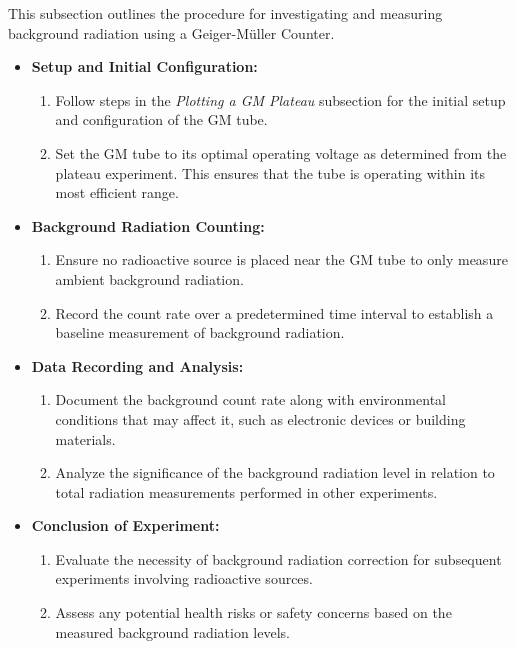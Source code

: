 \documentclass[11pt]{article}
\begin{document}
	This subsection outlines the procedure for investigating and measuring background radiation using a Geiger-Müller Counter.
	\begin{itemize}
		\item \textbf{Setup and Initial Configuration:}
		\begin{enumerate}
			\item Follow steps in the \textit{Plotting a GM Plateau} subsection for the initial setup and configuration of the GM tube.
			\item Set the GM tube to its optimal operating voltage as determined from the plateau experiment. This ensures that the tube is operating within its most efficient range.
		\end{enumerate}
		
		\item \textbf{Background Radiation Counting:}
		\begin{enumerate}
			\item Ensure no radioactive source is placed near the GM tube to only measure ambient background radiation.
			\item Record the count rate over a predetermined time interval to establish a baseline measurement of background radiation.
		\end{enumerate}
		
		\item \textbf{Data Recording and Analysis:}
		\begin{enumerate}
			\item Document the background count rate along with environmental conditions that may affect it, such as electronic devices or building materials.
			\item Analyze the significance of the background radiation level in relation to total radiation measurements performed in other experiments.
		\end{enumerate}
		
		\item \textbf{Conclusion of Experiment:}
		\begin{enumerate}
			\item Evaluate the necessity of background radiation correction for subsequent experiments involving radioactive sources.
			\item Assess any potential health risks or safety concerns based on the measured background radiation levels.
		\end{enumerate}
	\end{itemize}
	
\end{document}
